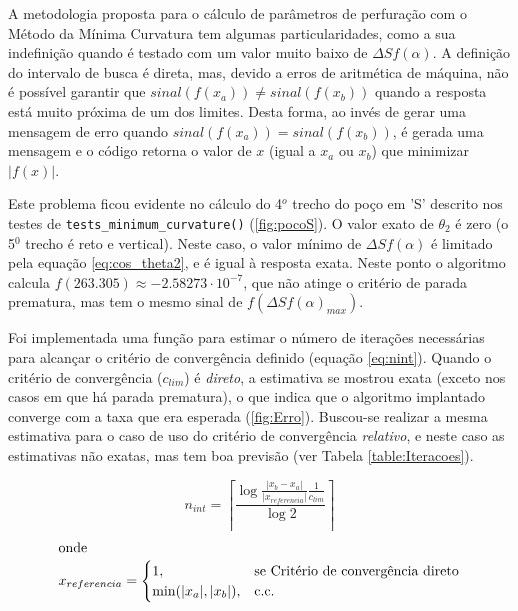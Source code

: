 \documentclass[final,3p,12pt]{elsarticle}
\begin{document}
    A metodologia proposta para o cálculo de parâmetros de perfuração com o Método da Mínima Curvatura tem algumas particularidades, como a sua indefinição quando é testado com um valor muito baixo de $\Delta S f(\alpha)$. A definição do intervalo de busca é direta, mas, devido a erros de aritmética de máquina, não é possível garantir que $sinal(f(x_a)) \neq sinal(f(x_b))$ quando a resposta está muito próxima de um dos limites. Desta forma, ao invés de gerar uma mensagem de erro quando $sinal(f(x_a)) = sinal(f(x_b))$, é gerada uma mensagem e o código retorna o valor de $x$ (igual a $x_a$ ou $x_b$) que minimizar $|f(x)|$.
    
    Este problema ficou evidente no cálculo do 4$^o$ trecho do poço em 'S' descrito nos testes de \verb|tests_minimum_curvature()| (\ref{fig:pocoS}). O valor exato de $\theta_2$ é zero (o 5$^0$ trecho é reto e vertical). Neste caso, o valor mínimo de $\Delta S f(\alpha)$ é limitado pela equação \ref{eq:cos_theta2}, e é igual à resposta exata. Neste ponto o algoritmo calcula $f(263.305) \approx -2.58273 \cdot 10^{-7}$, que não atinge o critério de parada prematura, mas tem o mesmo sinal de $f(\Delta S f(\alpha)_{max})$.

    Foi implementada uma função para estimar o número de iterações necessárias para alcançar o critério de convergência definido (equação \ref{eq:nint}). Quando o critério de convergência ($c_{lim}$) é \emph{direto}, a estimativa se mostrou exata (exceto nos casos em que há parada prematura), o que indica que o algoritmo implantado converge com a taxa que era esperada (\ref{fig:Erro}). Buscou-se realizar a mesma estimativa para o caso de uso do critério de convergência \emph{relativo}, e neste caso as estimativas não exatas, mas tem boa previsão (ver Tabela \ref{table:Iteracoes}).
    
    \begin{equation} \label{eq:nint}
        n_{int} = \left \lceil \frac{\log{\frac{|x_b-x_a|}{|x_{referencia}|}\frac{1}{c_{lim}}}}{\log{2}} \right \rceil
    \end{equation}
    \begin{align*}
        \intertext{onde}
        x_{referencia} = \begin{cases}
            1,&\text{se Critério de convergência direto} \\
            \min(|x_a|,|x_b|),&\text{c.c. }  
        \end{cases}
    \end{align*}
\end{document}
